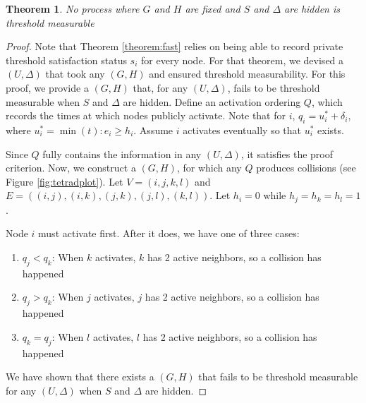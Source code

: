 \documentclass[a4paper]{article}
\newtheorem{theorem}{Theorem}
\begin{document}
\begin{comment}
Note how activation delays are seen by the researcher as an update

Do we observe delta? No!

Develop notation for ``researcher observed data'', which is a subset of fields in \omega

Assume U touches all nodes eventually
Assume that only nodes that would ever be activated are recorded

clarify hidden by default (delta always hidden, for instance)

make it clearer when we're playing nature and when we're playing researcher
\end{comment}

\begin{theorem} \label{theorem:public}
No process where $G$ and $H$ are fixed and $S$ and $\Delta$ are hidden is threshold measurable
\end{theorem}

\begin{proof}
Note that Theorem \ref{theorem:fast} relies on being able to record private threshold satisfaction status $s_i$ for every node. For that theorem, we devised a $(U, \Delta)$ that took any $(G, H)$ and ensured threshold measurability. For this proof, we provide a $(G, H)$ that, for any $(U, \Delta)$, fails to be threshold measurable when $S$ and $\Delta$ are hidden. Define an activation ordering $Q$, which records the times at which nodes publicly activate. Note that for $i$, $q_i = u_i^* + \delta_i$, where $u_i^* = \min(t) : e_i \ge h_i$. Assume $i$ activates eventually so that $u_i^*$ exists.

Since $Q$ fully contains the information in any $(U, \Delta)$, it satisfies the proof criterion. Now, we construct a $(G, H)$, for which any $Q$ produces collisions (see Figure \ref{fig:tetradplot}). Let $V = (i, j, k, l)$ and $E = ((i, j), (i, k), (j, k), (j, l), (k, l))$. Let $h_i = 0$ while $h_j = h_k = h_l = 1$.

Node $i$ must activate first. After it does, we have one of three cases:
\begin{enumerate} \label{theorem:impossible}
\item $q_j < q_k$: When $k$ activates, $k$ has 2 active neighbors, so a collision has happened
\item $q_j > q_k$: When $j$ activates, $j$ has 2 active neighbors, so a collision has happened
\item $q_k = q_j$: When $l$ activates, $l$ has 2 active neighbors, so a collision has happened
\end{enumerate}

\noindent
We have shown that there exists a $(G, H)$ that fails to be threshold measurable for any $(U, \Delta)$ when $S$ and $\Delta$ are hidden.

\end{proof}
\end{document}
